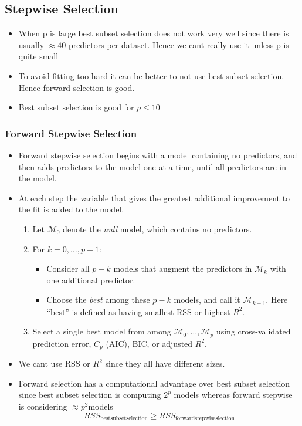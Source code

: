 \documentclass{article}
\begin{document}
\subsection{Stepwise Selection}

\begin{itemize}
    \item When p is large best subset selection does not work very well since there is usually $\approx 40$ predictors per dataset. Hence we cant really use it unless p is quite small
    \item To avoid fitting too hard it can be better to not use best subset selection. Hence forward selection is good.
    \item Best subset selection is good for $p \leq 10$
\end{itemize}

\subsubsection{Forward Stepwise Selection}
\begin{itemize}
    \item Forward stepwise selection begins with a model containing no predictors, and then adds predictors to the model one at a time, until all predictors are in the model.
    \item At each step the variable that gives the greatest additional improvement to the fit is added to the model.
    \begin{enumerate}[label=\arabic*.]
  \item Let $\mathcal M_0$ denote the \emph{null} model, which contains no predictors.
  
  \item For $k = 0,\dots,p-1$:
    \begin{itemize}
      \item Consider all $p - k$ models that augment the predictors in $\mathcal M_k$ with one additional predictor.
      \item Choose the \emph{best} among these $p - k$ models, and call it $\mathcal M_{k+1}$. Here “best” is defined as having smallest RSS or highest $R^2$.
    \end{itemize}
  \item Select a single best model from among $\mathcal M_0,\dots,\mathcal M_p$ using cross-validated prediction error, $C_p$ (AIC), BIC, or adjusted $R^2$.
    \end{enumerate}
    \item We cant use RSS or $R^2$ since they all have different sizes.
    \item Forward selection has a computational advantage over best subset selection since best subset selection is computing $2^p$ models whereas forward stepwise is considering $\approx p^2$models
    \begin{equation*}
        RSS_{\mathrm{best subset selection}} \geq RSS_{\mathrm{forward stepwise slection}}
    \end{equation*}
\end{itemize}
\end{document}
